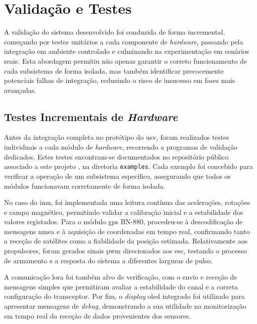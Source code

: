
\chapter{Validação e Testes}
\label{ch:validacaoTestes}

A validação do sistema desenvolvido foi conduzida de forma incremental, começando por testes unitários a cada componente de \emph{hardware}, passando pela integração em ambiente controlado e culminando na experimentação em cenários reais. Esta abordagem permitiu não apenas garantir o correto funcionamento de cada subsistema de forma isolada, mas também identificar precocemente potenciais falhas de integração, reduzindo o risco de insucesso em fases mais avançadas.  

\section{Testes Incrementais de \emph{Hardware}}

Antes da integração completa no protótipo do \gls{usv}, foram realizados testes individuais a cada módulo de \emph{hardware}, recorrendo a programas de validação dedicados. Estes testes encontram-se documentados no repositório público associado a este projeto \cite{github-usv}, na diretoria \texttt{examples}. Cada exemplo foi concebido para verificar a operação de um subsistema específico, assegurando que todos os módulos funcionavam corretamente de forma isolada.  

No caso do \gls{imu}, foi implementada uma leitura contínua das acelerações, rotações e campo magnético, permitindo validar a calibração inicial e a estabilidade dos valores registados. Para o módulo \gls{gps} BN-880, procedeu-se à descodificação de mensagens \gls{nmea} e à aquisição de coordenadas em tempo real, confirmando tanto a receção de satélites como a fiabilidade da posição estimada. Relativamente aos propulsores, foram gerados sinais \gls{pwm} direcionados aos \gls{esc}, testando o processo de armamento e a resposta do sistema a diferentes larguras de pulso.  

A comunicação \gls{lora} foi também alvo de verificação, com o envio e receção de mensagens simples que permitiram avaliar a estabilidade do canal e a correta configuração do transceptor. Por fim, o \emph{display} \gls{oled} integrado foi utilizado para apresentar mensagens de \emph{debug}, demonstrando a sua utilidade na monitorização em tempo real da receção de dados provenientes dos sensores.  

